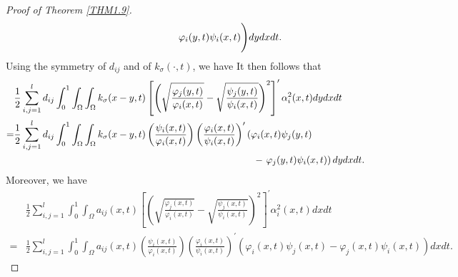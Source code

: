 \documentclass[11pt,reqno]{amsart}
\numberwithin{equation}{section}
\begin{document}
\begin{proof}[Proof of Theorem \ref{THM1.9}]
\begin{equation}
\begin{aligned}
&\hspace{3.5cm}\varphi_{i}(y,t)\psi_{i}(x,t) \Bigg)dydxdt.
\end{aligned}
\end{equation}
%
Using the symmetry of $d_{ij}$ and of $k_{\sigma}(\cdot,t)$, we have
%
%
It then follows that
%
\begin{align}\label{3-19}
&\frac{1}{2}\sum_{i,j=1}^{l}d_{ij} \int_{0}^{1} \int_{\Omega} \int_{\Omega}k_{\sigma}(x-y,t) \left[ \left( \sqrt{ \frac{\varphi_{j}(y,t)}{\varphi_{i}(x,t)}} - \sqrt{\frac{\psi_{j}(y,t)}{\psi_{i}(x,t)}} \right)^{2} \right]^{\prime}\alpha_{i}^{2}(x,t) dydxdt\\ \nonumber
=& \frac{1}{2}\sum_{i,j=1}^{l}d_{ij} \int_{0}^{1} \int_{\Omega} \int_{\Omega} k_{\sigma}(x-y,t)  \left( \frac{\psi_{i}(x,t)}{\varphi_{i}(x,t)} \right) \left( \frac{\varphi_{i}(x,t)}{\psi_{i}(x,t)} \right)^{\prime} \left( \varphi_{i}(x,t)\psi_{j}(y,t)\right. \\\nonumber
& \hspace{8.7cm} - \left. \varphi_{j}(y,t)\psi_{i}(x,t) \right)dydxdt.
\end{align}
%
%
Moreover, we have
\begin{equation}\label{3-20}
\begin{aligned}
&\frac{1}{2}\sum_{i,j=1}^{l} \int_{0}^{1}  \int_{\Omega}a_{ij}(x,t)\left[ \left( \sqrt{ \frac{\varphi_{j}(x,t)}{\varphi_{i}(x,t)}} - \sqrt{\frac{\psi_{j}(x,t)}{\psi_{i}(x,t)}} \right)^{2} \right]^{\prime}\alpha_{i}^{2}(x,t) dx dt\\
=& \frac{1}{2}\sum_{i,j=1}^{l} \int_{0}^{1}  \int_{\Omega} a_{ij}(x,t) \left( \frac{\psi_{i}(x,t)}{\varphi_{i}(x,t)} \right) \left( \frac{\varphi_{i}(x,t)}{\psi_{i}(x,t)} \right)^{\prime} \left( \varphi_{i}(x,t)\psi_{j}(x,t) - \varphi_{j}(x,t)\psi_{i}(x,t) \right)dx dt.
\end{aligned}
\end{equation}

\end{proof}
\end{document}
